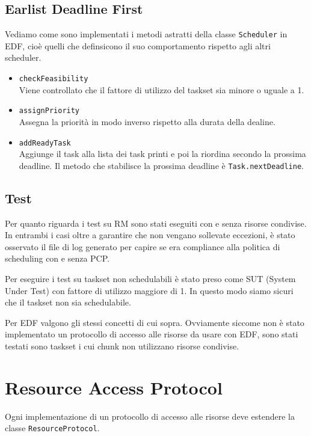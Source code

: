 \subsection{Earlist Deadline First}
Vediamo come sono implementati i metodi astratti della classe \texttt{Scheduler} in EDF, cioè quelli che definsicono il suo comportamento rispetto agli altri scheduler.
\begin{itemize}
    \item \texttt{checkFeasibility} \\
        Viene controllato che il fattore di utilizzo del taskset sia minore o uguale a 1.
    \item \texttt{assignPriority} \\
        Assegna la priorità in modo inverso rispetto alla durata della dealine.
    \item \texttt{addReadyTask} \\
        Aggiunge il task alla lista dei task printi e poi la riordina secondo la prossima deadline. Il metodo che stabilisce la prossima deadline è \texttt{Task.nextDeadline}.
\end{itemize}

\subsection{Test}
Per quanto riguarda i test su RM sono stati eseguiti con e senza risorse condivise. In entrambi i casi oltre a garantire che non vengano sollevate eccezioni, è stato osservato il file di log generato per capire se era compliance alla politica di scheduling con e senza PCP.

Per eseguire i test su taskset non schedulabili è stato preso come SUT (System Under Test) con fattore di utilizzo maggiore di 1. In questo modo siamo sicuri che il taskset non sia schedulabile.

\myskip

Per EDF valgono gli stessi concetti di cui sopra. Ovviamente siccome non è stato implementato un protocollo di accesso alle risorse da usare con EDF, sono stati testati sono taskset i cui chunk non utilizzano risorse condivise.

\section{Resource Access Protocol}
\label{sec:resaccprot}
Ogni implementazione di un protocollo di accesso alle risorse deve estendere la classe \texttt{ResourceProtocol}.

